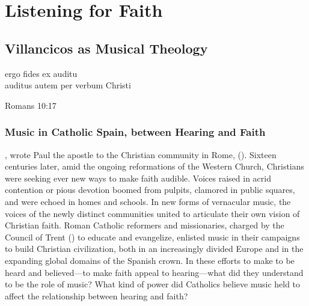 
% 

\part{Listening for Faith}
\label{part:faith}

\chapter{Villancicos as Musical Theology}
\label{ch:intro}

\epigraph
{ergo fides ex auditu\\
auditus autem per verbum Christi}
{Romans 10:17}

\section{Music in Catholic Spain, between Hearing and Faith}

, wrote Paul the apostle to the Christian
community in Rome, 
().
Sixteen centuries later, amid the ongoing reformations of the Western Church,
Christians were seeking ever new ways to make faith audible.
Voices raised in acrid contention or pious devotion boomed from pulpits,
clamored in public squares, and were echoed in homes and schools.  
In new forms of vernacular music, the voices of the newly distinct communities
united to articulate their own vision of Christian faith.
Roman Catholic reformers and missionaries, charged by the Council of
Trent (\XXX[years]) to educate and evangelize, enlisted music in their
campaigns to build Christian civilization, both in an increasingly divided
Europe and in the expanding global domains of the Spanish crown.
In these efforts to make  to be heard and
believed---to make faith appeal to hearing---what did they understand to be the
role of music?
What kind of power did Catholics believe music held to affect the relationship
between hearing and faith?

